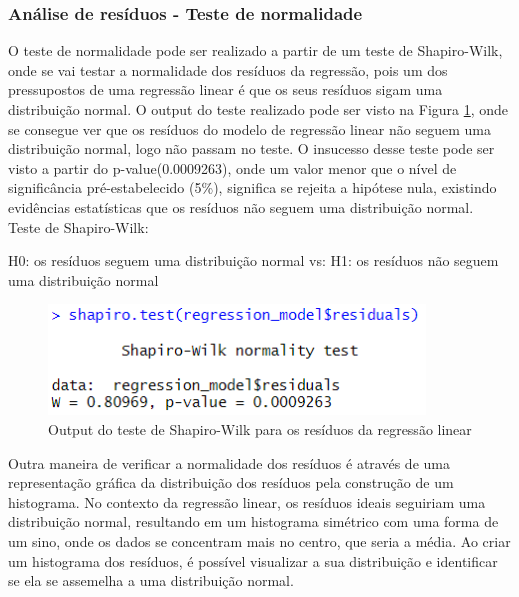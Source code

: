 \documentclass[%
 aip,
cp,  %
 amsmath,amssymb,%
 reprint,%
]{revtex4-2}
\begin{document}
\subsubsection{Análise de resíduos - Teste de normalidade}
O teste de normalidade pode ser realizado a partir de um teste de Shapiro-Wilk, onde se vai testar a normalidade dos resíduos da regressão, pois um dos pressupostos de uma regressão linear é que os seus resíduos sigam uma distribuição normal. O output do teste realizado pode ser visto na Figura \ref{questao3OutputTesteShapiro}, onde se consegue ver que os resíduos do modelo de regressão linear não seguem uma distribuição normal, logo não passam no teste. O insucesso desse teste pode ser visto a partir do p-value(0.0009263), onde um valor menor que o nível de significância pré-estabelecido (5\%), significa se rejeita a hipótese nula, existindo evidências estatísticas que os resíduos não seguem uma distribuição normal. \\

Teste de Shapiro-Wilk:
\begin{center}
    H0: os resíduos seguem uma distribuição normal
    \newline
    vs:
    \newline
    H1: os resíduos não seguem uma distribuição normal
    \newline
\end{center}

\begin{figure}[!h]
    \centering
    \includegraphics[width=10cm]{imagens/questao3/questao3OutputShapiroTest.png}
    \caption{Output do teste de Shapiro-Wilk para os resíduos da regressão linear}
    \label{questao3OutputTesteShapiro}
\end{figure}

Outra maneira de verificar a normalidade dos resíduos é através de uma representação gráfica da distribuição dos resíduos pela construção de um histograma. No contexto da regressão linear, os resíduos ideais seguiriam uma distribuição normal, resultando em um histograma simétrico com uma forma de um sino, onde os dados se concentram mais no centro, que seria a média. Ao criar um histograma dos resíduos, é possível visualizar a sua distribuição e identificar se ela se assemelha a uma distribuição normal.
\end{document}
